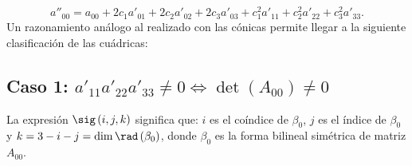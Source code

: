 \[a''_{00} = a_{00} + 2c_{1}a'_{01}+2c_{2}a'_{02}+2c_{3}a'_{03}+c_{1}^{2}a'_{11}+c_{2}^{2}a'_{22}+c_{3}^{2}a'_{33} .\]
Un razonamiento análogo al realizado con las cónicas permite llegar a la siguiente clasificación de las cuádricas:
\subsection*{Caso 1: $\displaystyle a'_{11}a'_{22}a'_{33} \neq 0 \iff \det\left(A_{00}\right) \neq 0 $}
\begin{notation}
\normalfont La expresión $\displaystyle \sig\left(i, j, k\right) $ significa que: $\displaystyle i $ es el coíndice de $\displaystyle \beta_{0} $, $\displaystyle j  $ es el índice de $\displaystyle \beta_{0} $ y $\displaystyle k = 3 - i- j = \dim \rad\left(\beta_{0}\right) $, donde $\displaystyle \beta_{0} $ es la forma bilineal simétrica de matriz $\displaystyle A_{00} $.
\end{notation}

